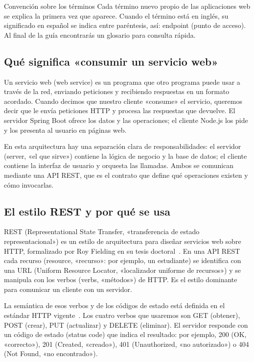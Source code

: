 \documentclass[11pt]{article}
\begin{document}
\begin{cajatip}{Convención sobre los términos}
Cada término nuevo propio de las aplicaciones web se explica la primera vez que aparece. Cuando el término está en inglés, su significado en español se indica entre paréntesis, así: endpoint (punto de acceso). Al final de la guía encontrarás un glosario para consulta rápida.\par
\end{cajatip}

\subsection{Qué significa «consumir un servicio web»}
Un servicio web (web service) es un programa que otro programa puede usar a través de la red, enviando peticiones y recibiendo respuestas en un formato acordado. Cuando decimos que nuestro cliente «consume» el servicio, queremos decir que le envía peticiones HTTP y procesa las respuestas que devuelve. El servidor Spring Boot ofrece los datos y las operaciones; el cliente Node.js los pide y los presenta al usuario en páginas web.

En esta arquitectura hay una separación clara de responsabilidades: el servidor (server, «el que sirve») contiene la lógica de negocio y la base de datos; el cliente contiene la interfaz de usuario y orquesta las llamadas. Ambos se comunican mediante una API REST, que es el contrato que define qué operaciones existen y cómo invocarlas.

\subsection{El estilo REST y por qué se usa}
REST (Representational State Transfer, «transferencia de estado representacional») es un estilo de arquitectura para diseñar servicios web sobre HTTP, formalizado por Roy Fielding en su tesis doctoral~\citep{fielding2000rest}. En una API REST cada recurso (resource, «recurso»: por ejemplo, un estudiante) se identifica con una URL (Uniform Resource Locator, «localizador uniforme de recursos») y se manipula con los verbos (verbs, «métodos») de HTTP. Es el estilo dominante para comunicar un cliente con un servidor.

La semántica de esos verbos y de los códigos de estado está definida en el estándar HTTP vigente~\citep{rfc9110http}. Los cuatro verbos que usaremos son GET (obtener), POST (crear), PUT (actualizar) y DELETE (eliminar). El servidor responde con un código de estado (status code) que indica el resultado: por ejemplo, 200 (OK, «correcto»), 201 (Created, «creado»), 401 (Unauthorized, «no autorizado») o 404 (Not Found, «no encontrado»).
\end{document}
